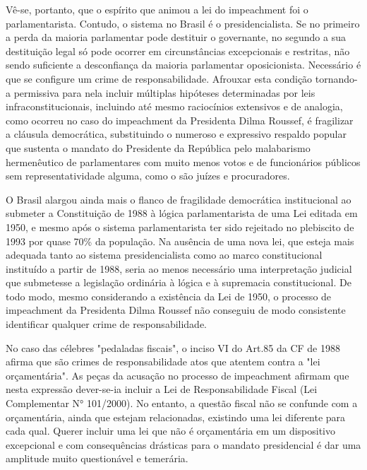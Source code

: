 Vê-se, portanto, que o espírito que animou a lei do impeachment foi o
parlamentarista. Contudo, o sistema no Brasil é o presidencialista. Se
no primeiro a perda da maioria parlamentar pode destituir o governante,
no segundo a sua destituição legal só pode ocorrer em circunstâncias
excepcionais e restritas, não sendo suficiente a desconfiança da maioria
parlamentar oposicionista. Necessário é que se configure um crime de
responsabilidade. Afrouxar esta condição tornando-a permissiva para nela
incluir múltiplas hipóteses determinadas por leis infraconstitucionais,
incluindo até mesmo raciocínios extensivos e de analogia, como ocorreu
no caso do impeachment da Presidenta Dilma Roussef, é fragilizar a
cláusula democrática, substituindo o numeroso e expressivo respaldo
popular que sustenta o mandato do Presidente da República pelo
malabarismo hermenêutico de parlamentares com muito menos votos e de
funcionários públicos sem representatividade alguma, como o são juízes e
procuradores.

O Brasil alargou ainda mais o flanco de fragilidade democrática
institucional ao submeter a Constituição de 1988 à lógica
parlamentarista de uma Lei editada em 1950, e mesmo após o sistema
parlamentarista ter sido rejeitado no plebiscito de 1993 por quase 70\%
da população. Na ausência de uma nova lei, que esteja mais adequada
tanto ao sistema presidencialista como ao marco constitucional
instituído a partir de 1988, seria ao menos necessário uma interpretação
judicial que submetesse a legislação ordinária à lógica e à supremacia
constitucional. De todo modo, mesmo considerando a existência da Lei de
1950, o processo de impeachment da Presidenta Dilma Roussef não
conseguiu de modo consistente identificar qualquer crime de
responsabilidade.

No caso das célebres "pedaladas fiscais", o inciso VI do Art.85 da CF de
1988 afirma que são crimes de responsabilidade atos que atentem contra a
"lei orçamentária". As peças da acusação no processo de impeachment
afirmam que nesta expressão dever-se-ia incluir a Lei de
Responsabilidade Fiscal (Lei Complementar N° 101/2000). No entanto, a
questão fiscal não se confunde com a orçamentária, ainda que estejam
relacionadas, existindo uma lei diferente para cada qual. Querer incluir
uma lei que não é orçamentária em um dispositivo excepcional e com
consequências drásticas para o mandato presidencial é dar uma amplitude
muito questionável e temerária.

